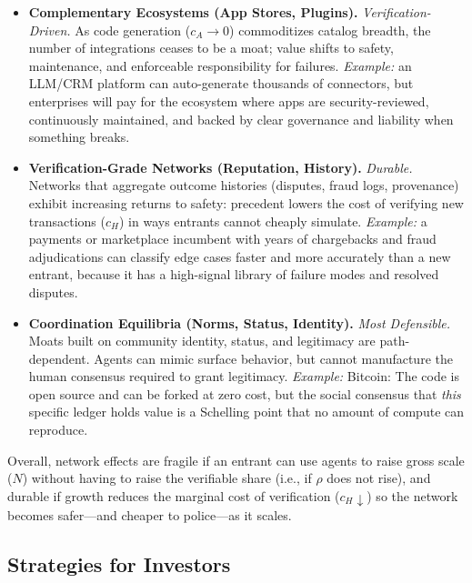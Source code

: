 \documentclass[12pt, letter]{article}
\begin{document}
\begin{itemize}
\item \textbf{Complementary Ecosystems (App Stores, Plugins).} \textit{Verification-Driven.}
As code generation ($c_A \to 0$) commoditizes catalog breadth, the number of integrations ceases to be a moat; value shifts to safety, maintenance, and enforceable responsibility for failures. \textit{Example:} an LLM/CRM platform can auto-generate thousands of connectors, but enterprises will pay for the ecosystem where apps are security-reviewed, continuously maintained, and backed by clear governance and liability when something breaks.

\item \textbf{Verification-Grade Networks (Reputation, History).} \textit{Durable.}
Networks that aggregate outcome histories (disputes, fraud logs, provenance) exhibit increasing returns to safety: precedent lowers the cost of verifying new transactions ($c_H$) in ways entrants cannot cheaply simulate. \textit{Example:} a payments or marketplace incumbent with years of chargebacks and fraud adjudications can classify edge cases faster and more accurately than a new entrant, because it has a high-signal library of failure modes and resolved disputes.


\item \textbf{Coordination Equilibria (Norms, Status, Identity).} \textit{Most Defensible.}
Moats built on community identity, status, and legitimacy are path-dependent. Agents can mimic surface behavior, but cannot manufacture the human consensus required to grant legitimacy. \textit{Example:} Bitcoin: The code is open source and can be forked at zero cost, but the social consensus that \textit{this} specific ledger holds value is a Schelling point that no amount of compute can reproduce.

\end{itemize}

Overall, network effects are fragile if an entrant can use agents to raise gross scale ($N$) without having to raise the verifiable share (i.e., if $\rho$ does not rise), and durable if growth reduces the marginal cost of verification ($c_H \downarrow$) so the network becomes safer---and cheaper to police---as it scales.

\clearpage

\subsection{Strategies for Investors}
\label{subsec:investors}
\end{document}

